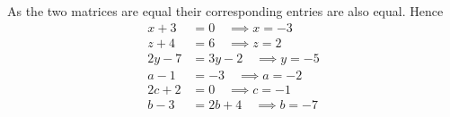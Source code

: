  As the two matrices are equal their corresponding entries are also equal. Hence
\begin{align}
x+3&=0 \quad \implies x=-3
\\
z+4&=6 \quad \implies z=2
\\
2y-7&=3y-2 \quad \implies y=-5
\\
a-1&=-3 \quad \implies a=-2
\\
2c+2&=0 \quad \implies c=-1
\\
b-3&=2b+4 \quad \implies b=-7
\end{align}
